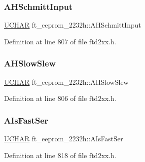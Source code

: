 \subsubsection{\texorpdfstring{A\+H\+Schmitt\+Input}{AHSchmittInput}}
{\footnotesize\ttfamily \hyperlink{CatCaloProto40MHz_2inc_2WinTypes_8h_a4f4bb67531a9bf6f0b9c6ad76aeba587}{U\+C\+H\+AR} ft\+\_\+eeprom\+\_\+2232h\+::\+A\+H\+Schmitt\+Input}



Definition at line 807 of file ftd2xx.\+h.

\mbox{\label{structft__eeprom__2232h_acfcd2fc032788785109a3f6cf48541a9}} 
\subsubsection{\texorpdfstring{A\+H\+Slow\+Slew}{AHSlowSlew}}
{\footnotesize\ttfamily \hyperlink{CatCaloProto40MHz_2inc_2WinTypes_8h_a4f4bb67531a9bf6f0b9c6ad76aeba587}{U\+C\+H\+AR} ft\+\_\+eeprom\+\_\+2232h\+::\+A\+H\+Slow\+Slew}



Definition at line 806 of file ftd2xx.\+h.

\mbox{\label{structft__eeprom__2232h_a0d84c7ea097453ff9d222c12ffc145f8}} 
\subsubsection{\texorpdfstring{A\+Is\+Fast\+Ser}{AIsFastSer}}
{\footnotesize\ttfamily \hyperlink{CatCaloProto40MHz_2inc_2WinTypes_8h_a4f4bb67531a9bf6f0b9c6ad76aeba587}{U\+C\+H\+AR} ft\+\_\+eeprom\+\_\+2232h\+::\+A\+Is\+Fast\+Ser}



Definition at line 818 of file ftd2xx.\+h.

\mbox{\label{structft__eeprom__2232h_a1f8310b3d7ee2c20328e1bdd812c0fa5}} 
